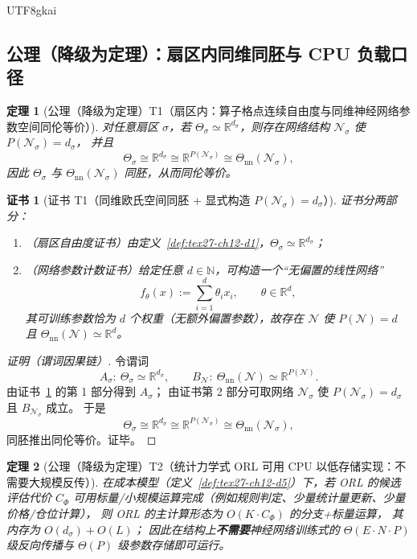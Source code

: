 \documentclass[12pt]{article}
\newtheorem{theorem}{定理}[section]
\newtheorem{Certificate}{证书}[section]
\newcommand{\RR}{\mathbb{R}}
\newcommand{\NN}{\mathbb{N}}
\begin{document}
\begin{CJK*}{UTF8}{gkai}
\subsection{公理（降级为定理）：扇区内同维同胚与 CPU 负载口径}
\label{subsec:tex27-ch12-axioms}

\begin{theorem}[公理（降级为定理）T1（扇区内：算子格点连续自由度与同维神经网络参数空间同伦等价）]
\label{thm:tex27-ch12-t1}
对任意扇区 $\sigma$，若 $\Theta_\sigma\simeq \RR^{d_\sigma}$，则存在网络结构 $\mathcal{N}_\sigma$ 使 $P(\mathcal{N}_\sigma)=d_\sigma$，
并且
\[
  \Theta_\sigma \cong \RR^{d_\sigma} \cong \RR^{P(\mathcal{N}_\sigma)} \cong \Theta_{\mathrm{nn}}(\mathcal{N}_\sigma),
\]
因此 $\Theta_\sigma$ 与 $\Theta_{\mathrm{nn}}(\mathcal{N}_\sigma)$ 同胚，从而同伦等价。
\end{theorem}

\begin{Certificate}[证书 T1（同维欧氏空间同胚 + 显式构造 $P(\mathcal{N}_\sigma)=d_\sigma$）]
\label{cert:tex27-ch12-t1}
证书分两部分：
\begin{enumerate}
  \item（扇区自由度证书）由定义~\ref{def:tex27-ch12-d1}，$\Theta_\sigma\simeq \RR^{d_\sigma}$；
  \item（网络参数计数证书）给定任意 $d\in\NN$，可构造一个“无偏置的线性网络”
  \[
    f_\theta(x):=\sum_{i=1}^{d}\theta_i x_i,
    \qquad
    \theta\in\RR^{d},
  \]
  其可训练参数恰为 $d$ 个权重（无额外偏置参数），故存在 $\mathcal{N}$ 使 $P(\mathcal{N})=d$ 且 $\Theta_{\mathrm{nn}}(\mathcal{N})\simeq\RR^d$。
\end{enumerate}
\end{Certificate}

\begin{proof}[证明（谓词因果链）]
令谓词
\[
  A_\sigma:\ \Theta_\sigma\simeq \RR^{d_\sigma},
  \qquad
  B_{\mathcal{N}}:\ \Theta_{\mathrm{nn}}(\mathcal{N})\simeq \RR^{P(\mathcal{N})}.
\]
由证书~\ref{cert:tex27-ch12-t1} 的第 1 部分得到 $A_\sigma$；
由证书第 2 部分可取网络 $\mathcal{N}_\sigma$ 使 $P(\mathcal{N}_\sigma)=d_\sigma$ 且 $B_{\mathcal{N}_\sigma}$ 成立。
于是
\[
  \Theta_\sigma\cong \RR^{d_\sigma}\cong \RR^{P(\mathcal{N}_\sigma)}\cong \Theta_{\mathrm{nn}}(\mathcal{N}_\sigma),
\]
同胚推出同伦等价。证毕。
\end{proof}

\begin{theorem}[公理（降级为定理）T2（统计力学式 ORL 可用 CPU 以低存储实现：不需要大规模反传）]
\label{thm:tex27-ch12-t2}
在成本模型（定义~\ref{def:tex27-ch12-d5}）下，若 ORL 的候选评估代价 $C_\Phi$ 可用标量/小规模运算完成（例如规则判定、少量统计量更新、少量价格/仓位计算），
则 ORL 的主计算形态为 $O(K\cdot C_\Phi)$ 的分支+标量运算，
其内存为 $O(d_\sigma)+O(L)$；
因此在结构上\textbf{不需要}神经网络训练式的 $\Theta(E\cdot N\cdot P)$ 级反向传播与 $\Theta(P)$ 级参数存储即可运行。
\end{theorem}


\end{CJK*}
\end{document}
